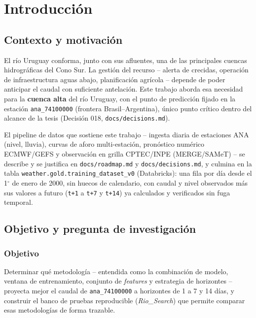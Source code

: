 \chapter{Introducci\'on}

\section{Contexto y motivaci\'on}

El r\'io Uruguay conforma, junto con sus afluentes, una de las principales cuencas hidrogr\'aficas
del Cono Sur. La gesti\'on del recurso -- alerta de crecidas, operaci\'on de infraestructura aguas
abajo, planificaci\'on agr\'icola -- depende de poder anticipar el caudal con suficiente
antelaci\'on. Este trabajo aborda esa necesidad para la \textbf{cuenca alta} del r\'io Uruguay,
con el punto de predicci\'on fijado en la estaci\'on \texttt{ana\_74100000} (frontera
Brasil--Argentina), \'unico punto cr\'itico dentro del alcance de la tesis (Decisi\'on 018,
\texttt{docs/decisions.md}).

El pipeline de datos que sostiene este trabajo -- ingesta diaria de estaciones ANA (nivel,
lluvia), curvas de aforo multi-estaci\'on, pron\'ostico num\'erico ECMWF/GEFS y observaci\'on en
grilla CPTEC/INPE (MERGE/SAMeT) -- se describe y se justifica en \texttt{docs/roadmap.md} y
\texttt{docs/decisions.md}, y culmina en la tabla \texttt{weather.gold.training\_dataset\_v0}
(Databricks): una fila por d\'ia desde el 1$^\circ$ de enero de 2000, sin huecos de calendario,
con caudal y nivel observados m\'as sus valores a futuro (\texttt{t+1} a \texttt{t+7} y
\texttt{t+14}) ya calculados y verificados sin fuga temporal.

\section{Objetivo y pregunta de investigaci\'on}

\subsection{Objetivo}

Determinar qu\'e metodolog\'ia -- entendida como la combinaci\'on de modelo, ventana de
entrenamiento, conjunto de \emph{features} y estrategia de horizontes -- proyecta mejor el caudal
de \texttt{ana\_74100000} a horizontes de 1 a 7 y 14 d\'ias, y construir el banco de pruebas
reproducible (\emph{Rio\_Search}) que permite comparar esas metodolog\'ias de forma trazable.

